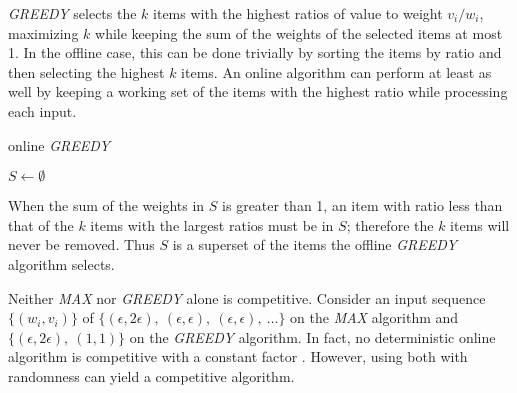 \emph{GREEDY} selects the $k$ items with the highest ratios of value to weight $v_i/w_i$, maximizing $k$ while keeping the sum of the weights of the selected items at most 1. In the offline case, this can be done trivially by sorting the items by ratio and then selecting the highest $k$ items. An online algorithm can perform at least as well by keeping a working set of the items with the highest ratio while processing each input.

\begin{algorithm}
	\caption{online \emph{GREEDY}}
	$S \leftarrow \emptyset$\;
\end{algorithm}

When the sum of the weights in $S$ is greater than 1, an item with ratio less than that of the $k$ items with the largest ratios must be in $S$; therefore the $k$ items will never be removed. Thus $S$ is a superset of the items the offline \emph{GREEDY} algorithm selects.

Neither \emph{MAX} nor \emph{GREEDY} alone is competitive. Consider an input sequence $\{(w_i,v_i)\}$ of $\{(\epsilon,2\epsilon),\ (\epsilon,\epsilon),\ (\epsilon,\epsilon),\ \ldots\}$ on the \emph{MAX} algorithm and $\{(\epsilon, 2\epsilon),\ (1,1)\}$ on the \emph{GREEDY} algorithm. In fact, no deterministic online algorithm is competitive with a constant factor \cite{iwama}. However, using both with randomness can yield a competitive algorithm.

